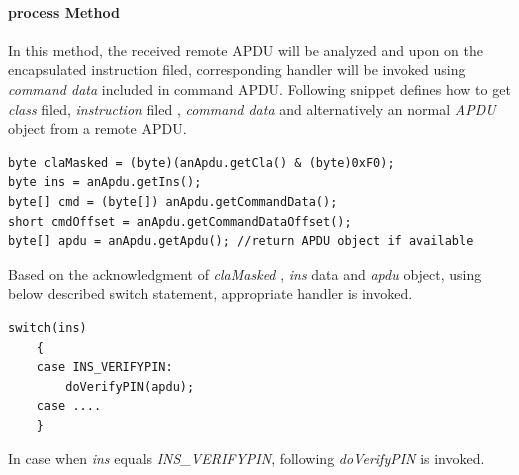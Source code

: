 \paragraph{process Method} \label{secDummy}
In this method, the received remote APDU will be analyzed and upon on the encapsulated instruction filed, corresponding handler will be invoked using \emph{command data} included in command APDU. Following snippet defines how to get \emph{class} filed, \emph{instruction} filed , \emph{command data} and alternatively an normal \emph{APDU} object from a remote APDU.


\begin{Verbatim}[frame=lines,framesep=4mm, label=\fbox{\small\emph{Remote APDU Operation}}]
byte claMasked = (byte)(anApdu.getCla() & (byte)0xF0);
byte ins = anApdu.getIns();
byte[] cmd = (byte[]) anApdu.getCommandData();	    
short cmdOffset = anApdu.getCommandDataOffset();
byte[] apdu = anApdu.getApdu(); //return APDU object if available
\end{Verbatim}

Based on the acknowledgment of \emph{claMasked} , \emph{ins} data and \emph{apdu} object, using below described switch statement, appropriate handler is invoked.

\begin{Verbatim}[frame=lines,framesep=4mm, label=\fbox{\small\emph{Switch Statement}}]
switch(ins)
	{
	case INS_VERIFYPIN:
		doVerifyPIN(apdu);
	case ....
	}
\end{Verbatim}
In case when \emph{ins} equals \emph{INS\_VERIFYPIN}, following \emph{doVerifyPIN} is invoked.

